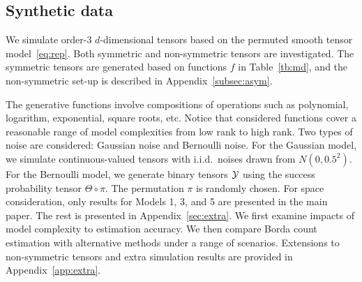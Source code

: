 \documentclass[12pt]{article}
\theoremstyle{definition}
\begin{document}
\subsection{Synthetic data}
We simulate order-3 $d$-dimensional tensors based on the permuted smooth tensor model~\eqref{eq:rep}. Both symmetric and non-symmetric tensors are investigated. The symmetric tensors are generated based on functions $f$ in Table~\ref{tb:md}, and the non-symmetric set-up is described in Appendix~\ref{subsec:asym}.
\begin{table}[htp]
    \centering
    \caption{\color{blue}Smooth functions in simulation. We define the numerical CP/Tucker rank as the minimal rank $r$ for which the relative approximation error is below $10^{-4}$. The reported rank in the table is estimated from a $100\times100\times100$ signal tensor generated by \eqref{eq:rep}.}
    \label{tb:md}
\end{table}
The generative functions involve compositions of operations such as polynomial, logarithm, exponential, square roots, etc. Notice that considered functions cover a reasonable range of model complexities from low rank to high rank. Two types of noise are considered: Gaussian noise and Bernoulli noise.
For the Gaussian model, we simulate continuous-valued tensors with i.i.d.\ noises drawn from $N(0,0.5^2)$. For the Bernoulli model, we generate binary tensors $\mathcal{Y}$ using the success probability tensor $\Theta \circ \pi$. The permutation $\pi$ is randomly chosen. For space consideration, only results for Models 1, 3, and 5 are presented in the main paper. The rest is presented in Appendix~\ref{sec:extra}. We first examine impacts of model complexity to estimation accuracy. We then compare Borda count estimation with alternative methods under a range of scenarios. Extensions to non-symmetric tensors and extra simulation results are provided in Appendix~\ref{app:extra}.
\end{document}
